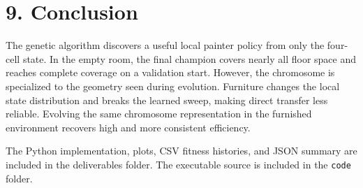 \documentclass[12pt,a4paper]{article}
\begin{document}
\section*{9. Conclusion}

The genetic algorithm discovers a useful local painter policy from only the four-cell state. In the empty room, the final champion covers nearly all floor space and reaches complete coverage on a validation start. However, the chromosome is specialized to the geometry seen during evolution. Furniture changes the local state distribution and breaks the learned sweep, making direct transfer less reliable. Evolving the same chromosome representation in the furnished environment recovers high and more consistent efficiency.

The Python implementation, plots, CSV fitness histories, and JSON summary are included in the deliverables folder. The executable source is included in the \texttt{code} folder.
\end{document}
